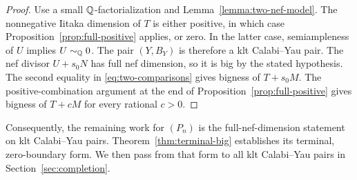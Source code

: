 \begin{proof}
Use a small $\mathbb Q$-factorialization and
Lemma~\ref{lemma:two-nef-model}.  The nonnegative Iitaka dimension
of $T$ is either positive, in which case
Proposition~\ref{prop:full-positive} applies, or zero.  In the latter
case, semiampleness of $U$ implies $U\sim_\mathbb Q0$.  The pair $(Y,B_Y)$
is therefore a klt Calabi--Yau pair.  The nef divisor $U+s_0N$ has
full nef dimension, so it is big by the stated hypothesis.
The second equality in \eqref{eq:two-comparisons} gives bigness of
$T+s_0M$.  The positive-combination argument at the end of
Proposition~\ref{prop:full-positive} gives bigness of $T+cM$ for
every rational $c>0$.
\end{proof}

Consequently, the remaining work for $(P_n)$ is the full-nef-dimension
statement on klt Calabi--Yau pairs.  Theorem~\ref{thm:terminal-big}
establishes its terminal, zero-boundary form.  We then pass from that
form to all klt Calabi--Yau pairs in Section~\ref{sec:completion}.
